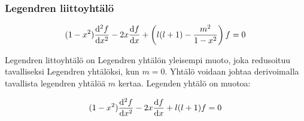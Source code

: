 \documentclass[../johdoksia.tex]{subfiles}
\begin{document}
\begin{comment}
		\intertext{Sijoitetaan $j + 2 = k \iff j = k - 2$:}
		f_{k} &= \frac{(k - l - 1)!\left(\frac{3 - l - k}{2}\right)!}{k!(3 - l - k)!\left(\frac{l - k + 3}{2}\right)!}\left(\frac{k + l - 1}{2}\right)\fallingfact{l}f_{0} \\
		f_{k} &= \frac{(k - l - 1)!\frac{(3 - l - k)!}{2^{\frac{3 - l - k}{2}}}}{k!(3 - l - k)!\frac{(l - k + 3)!}{2^{\frac{l - k + 3}{3}}}}\left(\frac{k + l - 1}{2}\right)\fallingfact{l}f_{0} \\
		f_{k} &= \frac{(k - l - 1)!2^{\frac{l - k + 3}{2}}}{k!(l - k + 3)!2^{\frac{3 - l - k}{2}}}\left(\frac{k + l - 1}{2}\right)\fallingfact{l}f_{0} \\
		f_{k} &= \frac{(k - l - 1)!2^{\frac{l - k + 3 - 3 + l + k}{2}}}{k!(l - k + 3)!}\left(\frac{k + l - 1}{2}\right)\fallingfact{l}f_{0} \\
		f_{k} &= \frac{(k - l - 1)!2^{\frac{2l}{2}}}{k!(l - k + 3)!}\left(\frac{k + l - 1}{2}\right)\fallingfact{l}f_{0} \\
		f_{k} &= 2^l\frac{(k - l - 1)!}{k!(l - k + 3)!}\left(\frac{k + l - 1}{2}\right)\fallingfact{l}f_{0} \\
	\end{align*}
	
		\intertext{Pochammerin symbolien ja binomikertoimien väillä on yhteys: $\alpha\fallingfact{n} = \binom{\alpha}{n}n!$:}
		f_{j + 2} &= \frac{2^{2j}}{(j + 2)!}\binom{\frac{j - l}{2}}{j}j!\binom{\frac{j + l + 1}{2}}{j}j!f_{0} \\
		\intertext{Sijoitetaan $j + 2 = n \iff j = n-2$:}
		f_{n} &= \frac{2^{2(n - 2)}}{n!}\binom{\frac{n - l - 2}{2}}{n - 2}(n - 2)!\binom{\frac{n + l - 1}{2}}{n - 2}(n - 2)!f_{0} \\
	\end{comment}

	\subsubsection{Legendren liittoyhtälö}
	
	\begin{equation}
		(1 - x^2)\odv{^2f}{x^2} - 2x\odv{f}{x} + \left(l(l + 1) - \frac{m^2}{1 - x^2}\right)f = 0
	\end{equation}
	
	Legendren littoyhtälö on Legendren yhtälön yleisempi muoto, joka redusoituu tavalliseksi Legendren yhtälöksi, kun $m = 0$. Yhtälö voidaan johtaa derivoimalla tavallista legendren yhtälöä $m$ kertaa. Legenden yhtälö on muotoa:
	
	\begin{equation*}
		(1 - x^2)\odv{^2f}{x^2} - 2x\odv{f}{x} + l(l + 1)f = 0
	\end{equation*}
\end{document}
